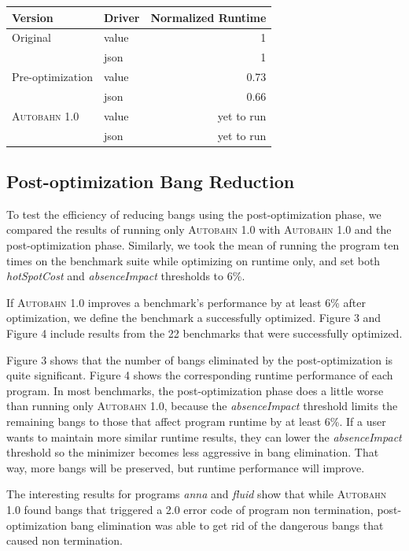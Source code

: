 \documentclass[format=sigplan]{acmart}
\newcommand{\hotspotcost}[0]{\textit{hotSpotCost}}
\newcommand{\dangerous}[0]{dangerous}
\newcommand{\Ao}[0]{\textsc{Autobahn 1.0}}
\newcommand{\postopt}[0]{post-optimization}
\newcommand{\Postopt}[0]{Post-optimization}
\newcommand{\absim}[0]{\textit{absenceImpact}}
\begin{document}
\begin{tabular}{llr}
\hline
Version   & Driver & Normalized Runtime \\
\hline
Original      & value   & 1     \\
          & json        & 1      \\
Pre-optimization       & value     & 0.73     \\
          & json        & 0.66	\\
\Ao{}       & value     & yet to run      \\
          & json        & yet to run	\\

\hline
\end{tabular}

\subsection{\Postopt{} Bang Reduction}

To test the efficiency of reducing bangs using the \postopt{} phase, we compared the results of running only \Ao{} with \Ao{} and the \postopt{} phase. Similarly, we took the mean of running the program ten times on the benchmark suite while optimizing on runtime only, and set both \hotspotcost{} and \absim{} thresholds to 6\%. 

If \Ao{} improves a benchmark's performance by at least 6\% after optimization, we define the benchmark a successfully optimized. Figure 3 and Figure 4 include results from the 22 benchmarks that were successfully optimized. 

Figure 3 shows that the number of bangs eliminated by the \postopt{} is quite significant. Figure 4 shows the corresponding runtime performance of each program. In most benchmarks, the \postopt{} phase does a little worse than running only \Ao{}, because the \absim{} threshold limits the remaining bangs to those that affect program runtime by at least 6\%. If a user wants to maintain more similar runtime results, they can lower the \absim{} threshold so the minimizer becomes less aggressive in bang elimination. That way, more bangs will be preserved, but runtime performance will improve. 

The interesting results for programs \textit{anna} and \textit{fluid} show that while \Ao{} found bangs that triggered a 2.0 error code of program non termination, \postopt{} bang elimination was able to get rid of the \dangerous{} bangs that caused non termination.
\end{document}
